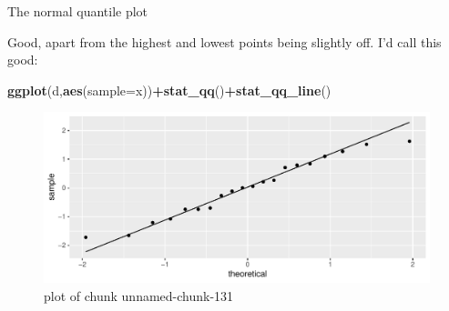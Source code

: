 \documentclass[
  ignorenonframetext,
]{beamer}
\newenvironment{Shaded}{\begin{snugshade}}{\end{snugshade}}
\newcommand{\DataTypeTok}[1]{\textcolor[rgb]{0.13,0.29,0.53}{#1}}
\newcommand{\KeywordTok}[1]{\textcolor[rgb]{0.13,0.29,0.53}{\textbf{#1}}}
\newcommand{\NormalTok}[1]{#1}
\newcommand{\OperatorTok}[1]{\textcolor[rgb]{0.81,0.36,0.00}{\textbf{#1}}}
\begin{document}
\begin{frame}[fragile]{The normal quantile plot}
\protect\hypertarget{the-normal-quantile-plot-2}{}

Good, apart from the highest and lowest points being slightly off. I'd
call this good:

\begin{Shaded}
\begin{Highlighting}[]
\KeywordTok{ggplot}\NormalTok{(d,}\KeywordTok{aes}\NormalTok{(}\DataTypeTok{sample=}\NormalTok{x))}\OperatorTok{+}\KeywordTok{stat_qq}\NormalTok{()}\OperatorTok{+}\KeywordTok{stat_qq_line}\NormalTok{()}
\end{Highlighting}
\end{Shaded}

\begin{figure}
\centering
\includegraphics{figure/unnamed-chunk-131-1.pdf}
\caption{plot of chunk unnamed-chunk-131}
\end{figure}

\end{frame}
\end{document}

